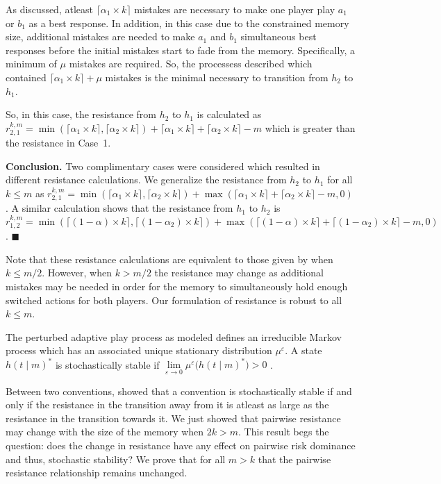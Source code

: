 \documentclass[11.5pt]{article}
\begin{document}
As discussed, atleast $\lceil \alpha_1 \times k \rceil$ mistakes are necessary to make one player play $a_1$ or $b_1$ as a best response. In addition, in this case due to the constrained memory size, additional mistakes are needed to make $a_1$ and $b_1$ simultaneous best responses before the initial mistakes start to fade from the memory. Specifically, a minimum of $\mu$ mistakes are required. So, the processess described which contained $\lceil \alpha_1 \times k \rceil + \mu$ mistakes is the minimal necessary to transition from $h_2$ to $h_1$.

So, in this case, the resistance from $h_2$ to $h_1$ is calculated as $r_{2,1}^{k,m} = \min(\lceil \alpha_1 \times k \rceil,\lceil \alpha_2 \times k \rceil)+\lceil \alpha_1 \times k \rceil+\lceil \alpha_2 \times k \rceil-m$ which is greater than the resistance in Case~1.

{\bf Conclusion.} Two complimentary cases were considered which resulted in different resistance calculations. We generalize the resistance from $h_2$ to $h_1$ for all $k \leq m$ as $r^{k,m}_{2,1}=\min(\lceil \alpha_1 \times k \rceil,\lceil \alpha_2 \times k \rceil)+\max(\lceil \alpha_1 \times k \rceil+\lceil \alpha_2 \times k \rceil-m,0)$. A similar calculation shows that the resistance from $h_1$ to $h_2$ is $r^{k,m}_{1,2}=\min(\lceil (1-\alpha) \times k \rceil,\lceil (1-\alpha_2) \times  k \rceil)+\max(\lceil (1-\alpha) \times k \rceil+\lceil (1-\alpha_2) \times k \rceil-m,0)$.
$\blacksquare$

Note that these resistance calculations are equivalent to those given by \cite{Young1998} when $k \leq m/2$. However, when $k>m/2$ the resistance may change as additional mistakes may be needed in order for the memory to simultaneously hold enough switched actions for both players. Our formulation of resistance is robust to all $k \leq m$. 


The perturbed adaptive play process as modeled defines an irreducible Markov process which has an associated unique stationary distribution $\mu^\varepsilon$. A state $h(t\mid m)^*$ is stochastically stable if $\lim \limits_{\varepsilon \rightarrow 0} \mu^\varepsilon\big(h(t\mid m)^*\big) > 0$ \cite{young1993evolution}.

Between two conventions, \cite{Young1998} showed that a convention is stochastically stable if and only if the resistance in the transition away from it is atleast as large as the resistance in the transition towards it.
We just showed that pairwise resistance may change with the size of the memory when $2k > m$. This result begs the question: does the change in resistance have any effect on pairwise risk dominance and thus, stochastic stability? We prove that for all $m > k$ that the pairwise resistance relationship remains unchanged.
\end{document}
